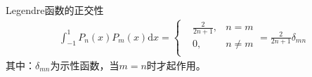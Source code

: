                 \par
                Legendre函数的正交性
                \begin{align*}
                    \int_{-1}^1 P_n(x) P_m(x) \mathrm{d}x =
                    \left\{
                        \begin{aligned}
                            &\frac{2}{2n+1}, & n = m\\
                            &0, & n \neq m\\
                        \end{aligned}
                    \right.
                    = \frac{2}{2n+1} \delta_{mn}
                \end{align*}
                其中：$\delta_{mn}$为示性函数，当$m = n$时才起作用。

